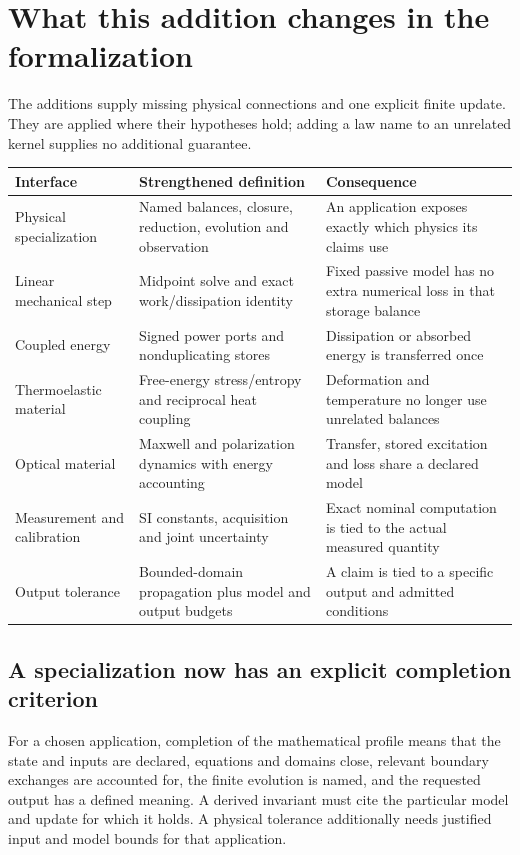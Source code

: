 \section{What this addition changes in the formalization}
\label{sec:r13-completion}
The additions supply missing physical connections and one explicit finite
update. They are applied where their hypotheses hold; adding a law name to
an unrelated kernel supplies no additional guarantee.

\begin{center}\small
\begin{tabularx}{\linewidth}{@{}P{37mm}Y Y@{}}
\toprule Interface & Strengthened definition & Consequence\\\midrule
Physical specialization & Named balances, closure, reduction, evolution and observation & An application exposes exactly which physics its claims use\\
Linear mechanical step & Midpoint solve and exact work/dissipation identity & Fixed passive model has no extra numerical loss in that storage balance\\
Coupled energy & Signed power ports and nonduplicating stores & Dissipation or absorbed energy is transferred once\\
Thermoelastic material & Free-energy stress/entropy and reciprocal heat coupling & Deformation and temperature no longer use unrelated balances\\
Optical material & Maxwell and polarization dynamics with energy accounting & Transfer, stored excitation and loss share a declared model\\
Measurement and calibration & SI constants, acquisition and joint uncertainty & Exact nominal computation is tied to the actual measured quantity\\
Output tolerance & Bounded-domain propagation plus model and output budgets & A claim is tied to a specific output and admitted conditions\\
\bottomrule
\end{tabularx}\end{center}

\subsection{A specialization now has an explicit completion criterion}
For a chosen application, completion of the mathematical profile means that
the state and inputs are declared, equations and domains close, relevant
boundary exchanges are accounted for, the finite evolution is named, and the
requested output has a defined meaning. A derived invariant must cite the
particular model and update for which it holds. A physical tolerance additionally
needs justified input and model bounds for that application.

